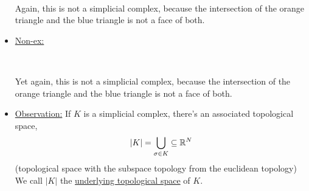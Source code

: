 \documentclass[../notes.tex]{subfiles}
\begin{document}
\begin{itemize}
\begin{center}
\\
        \end{center}
        Again, this is not a simplicial complex, because the intersection of the orange 
        triangle and the blue triangle is not a face of both.
    \item \underline{Non-ex:}\\
        \begin{center}
            \\
        \end{center}
        Yet again, this is not a simplicial complex, because the intersection of the orange 
        triangle and the blue triangle is not a face of both.
    \item
        \underline{Observation:} If $K$ is a simplicial complex, there's an associated
        topological space,
        \[
            |K|=\bigcup_{\sigma\in K}\subseteq \mathbb{R}^N
        \]
        (topological space with the subspace topology from the euclidean topology)\\
        We call $|K|$ the \underline{underlying topological space} of $K$.
\end{itemize}
\end{document}
